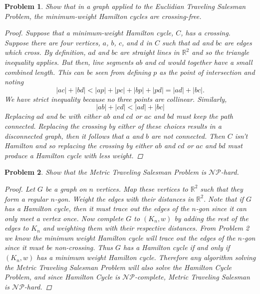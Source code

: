 \documentclass{article}
\newtheorem{problem}{Problem}
\begin{document}
\begin{problem}
Show that in a graph applied to the Euclidian Traveling Salesman Problem, the minimum-weight Hamilton cycles are crossing-free.
\begin{proof}
Suppose that a minimum-weight Hamilton cycle, $C$, has a crossing. Suppose there are four vertices, $a$, $b$, $c$, and $d$ in $C$ such that $ad$ and $bc$ are edges which cross. By definition, $ad$ and $bc$ are straight lines in $\mathbb{R}^2$ and so the triangle inequality applies. But then, line segments $ab$ and $cd$ would together have a small combined length. This can be seen from defining $p$ as the point of intersection and noting
\[
|ac| + |bd| < |ap| + |pc| + |bp| + |pd| = |ad| + |bc|.
\]
We have strict inequality because no three points are collinear. Similarly,
\[
|ab| + |cd| < |ad| + |bc|
\]
Replacing $ad$ and $bc$ with either $ab$ and $cd$ or $ac$ and $bd$ must keep the path connected. Replacing the crossing by either of these choices results in a disconnected graph, then it follows that $a$ and $b$ are not connected. Then $C$ isn't Hamilton and so replacing the crossing by either $ab$ and $cd$ or $ac$ and $bd$ must produce a Hamilton cycle with less weight.
\end{proof}
\end{problem}

\begin{problem}
Show that the Metric Traveling Salesman Problem is $\mathcal{NP}$-hard.
\begin{proof}
Let $G$ be a graph on $n$ vertices. Map these vertices to $\mathbb{R}^2$ such that they form a regular $n$-gon. Weight the edges with their distances in $\mathbb{R}^2$. Note that if $G$ has a Hamilton cycle, then it must trace out the edges of the $n$-gon since it can only meet a vertex once. Now complete $G$ to $(K_n, w)$ by adding the rest of the edges to $K_n$ and weighting them with their respective distances. From Problem 2 we know the minimum weight Hamilton cycle will trace out the edges of the $n$-gon since it must be non-crossing. Thus $G$ has a Hamilton cycle if and only if $(K_n,w)$ has a minimum weight Hamilton cycle. Therefore any algorithm solving the Metric Traveling Salesman Problem will also solve the Hamilton Cycle Problem, and since Hamilton Cycle is $\mathcal{NP}$-complete, Metric Traveling Salesman is $\mathcal{NP}$-hard.
\end{proof}
\end{problem}
\end{document}
